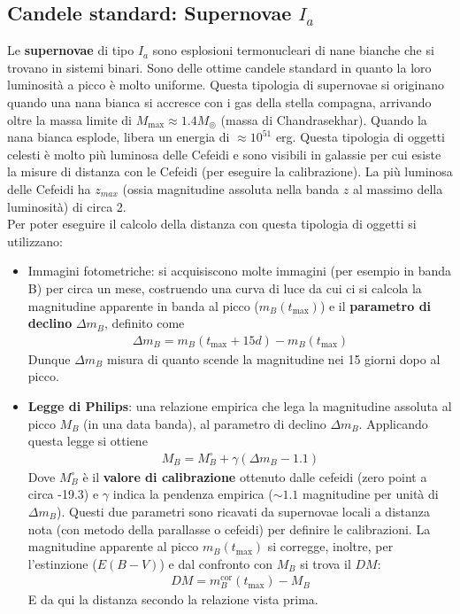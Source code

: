 \documentclass[a4paper, oneside]{book}
\begin{document}
\subsection{Candele standard: Supernovae $I_a$ }
Le \textbf{supernovae} di tipo $I_a$ sono esplosioni termonucleari di nane bianche 
che si trovano in sistemi binari. Sono delle ottime candele standard in quanto la loro 
luminosità a picco è molto uniforme. Questa tipologia di supernovae si originano quando 
una nana bianca si accresce con i gas della stella compagna, arrivando oltre la massa limite
di $M_{\max} \approx 1.4 M_{\circledcirc}$ (massa di Chandrasekhar). Quando la nana bianca esplode, 
libera un energia di $\approx 10^{51}$ erg. Questa tipologia di oggetti celesti
è molto più luminosa delle Cefeidi e sono visibili in galassie per cui esiste la misure di distanza
con le Cefeidi (per eseguire la calibrazione). La più luminosa delle Cefeidi 
ha $z_{max}$ (ossia magnitudine assoluta nella banda $z$ al massimo della 
luminosità) di circa 2. \\ \noindent
Per poter eseguire il calcolo della distanza con questa tipologia di oggetti si utilizzano:
\begin{itemize}
    \item Immagini fotometriche: si acquisiscono molte immagini (per esempio in banda B) per circa
    un mese, costruendo una curva di luce da cui ci si calcola la magnitudine
    apparente in banda al picco ($m_B(t_\text{max})$) e il \textbf{parametro di declino} $\Delta m_B$, 
    definito come 
    \begin{gather*}
        \Delta m_B = m_B (t_\text{max} + 15 d) - m_B(t_{\max})
    \end{gather*}
    Dunque $\Delta m_B$ misura di quanto scende la magnitudine nei 15 giorni dopo al picco.
    \item \textbf{Legge di Philips}: una relazione empirica che lega la magnitudine assoluta al picco $M_B$ (in una data banda), 
    al parametro di declino $\Delta m_B$. Applicando questa legge si ottiene 
    \begin{gather*}
        M_B = M_B^{\circ} + \gamma(\Delta m_B - 1.1)
    \end{gather*}
    Dove $M_B^{\circ}$ è il \textbf{valore di calibrazione} ottenuto dalle cefeidi (zero point a circa -19.3) e $\gamma$
    indica la pendenza empirica ($\sim 1.1$ magnitudine per unità di $\Delta m_B$). Questi due parametri sono ricavati 
    da supernovae locali a distanza nota (con metodo della parallasse o cefeidi) per definire le calibrazioni. 
    La magnitudine apparente al picco $m_B(t_{\max})$ si corregge, inoltre, per l'estinzione ($E(B - V)$) e dal confronto 
    con $M_B$ si trova il $DM$:
    \begin{align}
        DM = m_B^{\text{cor}} (t_{\max}) - M_B
    \end{align}
    E da qui la distanza secondo la relazione vista prima.
\end{itemize}
\end{document}
